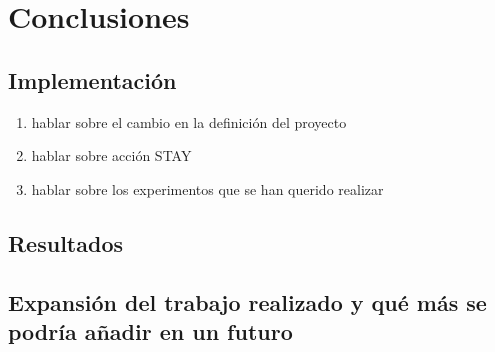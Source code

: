 
\chapter{Conclusiones}

\section{Implementación}

\begin{enumerate}
    \item hablar sobre el cambio en la definición del proyecto
    \item hablar sobre acción STAY
    \item hablar sobre los experimentos que se han querido realizar
\end{enumerate}

\section{Resultados}

\section{Expansión del trabajo realizado y qué más se podría añadir en un futuro}